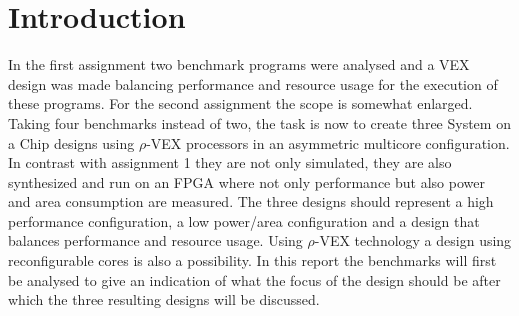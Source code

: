 \section{Introduction}
In the first assignment two benchmark programs were analysed and a VEX design was made balancing performance and resource usage for the execution of these programs. For the second assignment the scope is somewhat enlarged. Taking four benchmarks instead of two, the task is now to create three System on a Chip designs using $\rho$-VEX processors in an asymmetric multicore configuration. In contrast with assignment 1 they are not only simulated, they are also synthesized and run on an FPGA where not only performance but also power and area consumption are measured. The three designs should represent a high performance configuration, a low power/area configuration and a design that balances performance and resource usage. Using $\rho$-VEX technology a design using reconfigurable cores is also a possibility. In this report the benchmarks will first be analysed to give an indication of what the focus of the design should be after which the three resulting designs will be discussed.